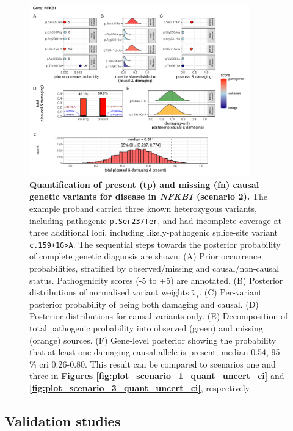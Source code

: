 \begin{figure}[ht]
  \centering
  \includegraphics[width=0.85\textwidth]{../images/plot_scenario_2_quant_uncert_ci.pdf}
  \caption{
    \textbf{Quantification of present (\ac{tp}) and missing (\ac{fn}) causal genetic variants for disease in \textit{NFKB1} (scenario 2).}
    The example proband carried three known heterozygous variants, including pathogenic \texttt{p.Ser237Ter}, and had incomplete coverage at three additional loci, including likely-pathogenic splice-site variant \texttt{c.159+1G{\small\textgreater}A}.  The sequential steps towards the posterior  probability of complete genetic diagnosis are shown:
    (A) Prior occurrence probabilities, stratified by observed/missing and causal/non-causal status. Pathogenicity scores (-5 to +5) are annotated.
    (B) Posterior distributions of normalised variant weights \(\tilde{\pi}_i\).  
    (C) Per-variant posterior probability of being both damaging and causal.  
    (D) Posterior distributions for causal variants only.  
    (E) Decomposition of total pathogenic probability into observed (green) and missing (orange) sources.  
    (F) Gene-level posterior showing the probability that at least one damaging causal allele is present; median 0.54, 95\,\% \ac{cri} 0.26-0.80. This result can be compared to scenarios one and three in 
    \textbf{Figures \ref{fig:plot_scenario_1_quant_uncert_ci}} and
    \textbf{\ref{fig:plot_scenario_3_quant_uncert_ci}}, respectively.
  }
  \label{fig:plot_scenario_2_quant_uncert_ci}
\end{figure}

\FloatBarrier
\subsection{Validation studies}
